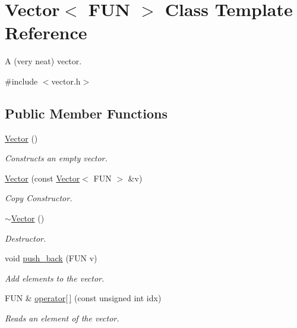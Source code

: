 \hypertarget{classVector}{}\section{Vector$<$ F\+UN $>$ Class Template Reference}
\label{classVector}


A (very neat) vector.  




{\ttfamily \#include $<$vector.\+h$>$}

\subsection*{Public Member Functions}
\begin{DoxyCompactItemize}
\item 
\hyperlink{classVector_a194c6782f240165dc863402fe4749146}{Vector} ()
\begin{DoxyCompactList}\small\item\em Constructs an empty vector. \end{DoxyCompactList}\item 
\hyperlink{classVector_aff6118a543c759563742b161901f9afa}{Vector} (const \hyperlink{classVector}{Vector}$<$ F\+UN $>$ \&v)
\begin{DoxyCompactList}\small\item\em Copy Constructor. \end{DoxyCompactList}\item 
\mbox{\label{classVector_ac4d0b4dac40851353105af00b8cc6698}} 
\hyperlink{classVector_ac4d0b4dac40851353105af00b8cc6698}{$\sim$\+Vector} ()
\begin{DoxyCompactList}\small\item\em Destructor. \end{DoxyCompactList}\item 
void \hyperlink{classVector_a5fec15adc006c9cc934664fe79ba50b9}{push\+\_\+back} (F\+UN v)
\begin{DoxyCompactList}\small\item\em Add elements to the vector. \end{DoxyCompactList}\item 
F\+UN \& \hyperlink{classVector_a4c61dff267d82d1e33aebded9d40e489}{operator\mbox{[}$\,$\mbox{]}} (const unsigned int idx)
\begin{DoxyCompactList}\small\item\em Reads an element of the vector. \end{DoxyCompactList}\item 

\end{DoxyCompactItemize}
